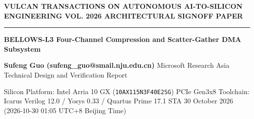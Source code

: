 \documentclass[11pt,a4paper]{article}
\begin{document}
{\scriptsize\sffamily\textcolor{vulcan}{\textbf{VULCAN TRANSACTIONS ON AUTONOMOUS AI-TO-SILICON ENGINEERING \hfill VOL. 2026 \textperiodcentered{} ARCHITECTURAL SIGNOFF PAPER}}\par}

\vspace{1pt}\textcolor{vulcan}{\rule{\textwidth}{1.2pt}}\vspace{4pt}

\begin{center}

{\sffamily\LARGE\bfseries BELL\allowbreak{}OWS-L3 Four-Chan\allowbreak{}nel Comp\allowbreak{}ress\allowbreak{}ion and Scat\allowbreak{}ter-Gath\allowbreak{}er DMA Subs\allowbreak{}yste\allowbreak{}m\par}\vspace{3pt}

{\small\sffamily\textbf{Sufe\allowbreak{}ng Guo (\allowbreak{}sufe\allowbreak{}ng\_\allowbreak{}guo@smai\allowbreak{}l.nju.edu.cn)\allowbreak{}} \textperiodcentered{} Microsoft Research Asia \textperiodcentered{} Technical Design and Verification Report\par}\vspace{1pt}

{\scriptsize\sffamily\textcolor{black!75}{Silicon Platform: Intel Arria 10 GX (\texttt{10AX115N3F40E2SG}) PCIe Gen3x8 \textperiodcentered{} Toolchain: Icarus Verilog 12.0 / Yosys 0.33 / Quartus Prime 17.1 STA \textperiodcentered{} 30 Octo\allowbreak{}ber 2026 (\allowbreak{}2026-10-30 01:05 UTC+\allowbreak{}8 Beij\allowbreak{}ing Time)\allowbreak{}}\par}

\end{center}\vspace{2pt}
\end{document}
